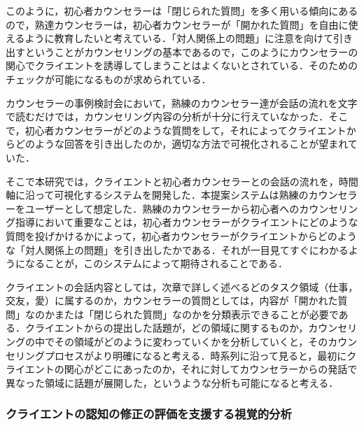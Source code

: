 \documentclass[shuuron]{kuee}
\begin{document}
このように，初心者カウンセラーは「閉じられた質問」を多く用いる傾向にあるので，熟達カウンセラーは，初心者カウンセラーが「開かれた質問」を自由に使えるように教育したいと考えている．「対人関係上の問題」に注意を向けて引き出すということがカウンセリングの基本であるので，このようにカウンセラーの関心でクライエントを誘導してしまうことはよくないとされている．そのためのチェックが可能になるものが求められている．

カウンセラーの事例検討会において，熟練のカウンセラー達が会話の流れを文字で読むだけでは，カウンセリング内容の分析が十分に行えていなかった．そこで，初心者カウンセラーがどのような質問をして，それによってクライエントからどのような回答を引き出したのか，適切な方法で可視化されることが望まれていた．

そこで本研究では，クライエントと初心者カウンセラーとの会話の流れを，時間軸に沿って可視化するシステムを開発した．本提案システムは熟練のカウンセラーをユーザーとして想定した．熟練のカウンセラーから初心者へのカウンセリング指導において重要なことは，初心者カウンセラーがクライエントにどのような質問を投げかけるかによって，初心者カウンセラーがクライエントからどのような「対人関係上の問題」を引き出したかである．それが一目見てすぐにわかるようになることが，このシステムによって期待されることである．%



クライエントの会話内容としては，次章で詳しく述べるどのタスク領域（仕事，交友，愛）に属するのか，カウンセラーの質問としては，内容が「開かれた質問」なのかまたは「閉じられた質問」なのかを分類表示できることが必要である．クライエントからの提出した話題が，どの領域に関するものか，カウンセリングの中でその領域がどのように変わっていくかを分析していくと，そのカウンセリングプロセスがより明確になると考える．時系列に沿って見ると，最初にクライエントの関心がどこにあったのか，それに対してカウンセラーからの発話で異なった領域に話題が展開した，というような分析も可能になると考える．



\subsubsection{クライエントの認知の修正の評価を支援する視覚的分析}

\end{document}
